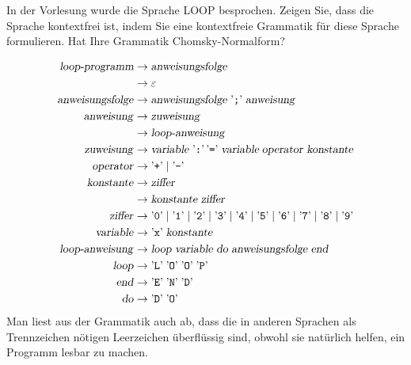 In der Vorlesung wurde die Sprache LOOP besprochen. Zeigen Sie, dass
die Sprache kontextfrei ist, indem Sie eine
kontextfreie Grammatik für diese Sprache formulieren.
Hat Ihre Grammatik Chomsky-Normalform?

\begin{loesung}
\begin{align*}
\text{\textsl{loop-programm}}&\to\text{\textsl{anweisungsfolge}}\\
&\to\varepsilon\\
\text{\textsl{anweisungsfolge}}
&\to\text{\textsl{anweisungsfolge}}\;\text{'{\tt ;}'}\;
\text{\textsl{anweisung}}
\\
\text{\textsl{anweisung}}
&\to\text{\textsl{zuweisung}}
\\
&\to\text{\textsl{loop-anweisung}}
\\
\text{\textsl{zuweisung}}
&\to
\text{\textsl{variable}}\; \text{'{\tt :}'}\, \text{'{\tt =}'}\;
\textsl{variable}\;\text{\textsl{operator}}\;\text{\textsl{konstante}}
\\
\text{\textsl{operator}}
&\to\text{'{\tt +}'}\;|\;\text{'{\tt -}'}
\\
\text{\textsl{konstante}}&\to\text{\textsl{ziffer}}\\
&\to\text{\textsl{konstante}}\;\text{\textsl{ziffer}}
\\
\text{\textsl{ziffer}}&\to 
\text{'{\tt 0}'}\;|\;
\text{'{\tt 1}'}\;|\;
\text{'{\tt 2}'}\;|\;
\text{'{\tt 3}'}\;|\;
\text{'{\tt 4}'}\;|\;
\text{'{\tt 5}'}\;|\;
\text{'{\tt 6}'}\;|\;
\text{'{\tt 7}'}\;|\;
\text{'{\tt 8}'}\;|\;
\text{'{\tt 9}'}\\
\text{\textsl{variable}}&\to \text{'{\tt x}'}\;\text{\textsl{konstante}}\\
\text{\textsl{loop-anweisung}}&\to
\text{\textsl{loop}}\;
\text{\textsl{variable}}\;
\text{\textsl{do}}\;
\text{\textsl{anweisungsfolge}}\;
\text{\textsl{end}}\\
\text{\textsl{loop}}&\to \text{'{\tt L}'}\; \text{'{\tt O}'}\; \text{'{\tt O}'}\; \text{'{\tt P}'}\\
\text{\textsl{end}}&\to \text{'{\tt E}'}\; \text{'{\tt N}'}\; \text{'{\tt D}'}\\
\text{\textsl{do}}&\to \text{'{\tt D}'}\; \text{'{\tt O}'} \\
\end{align*}
Man liest aus der Grammatik auch ab, dass die in anderen Sprachen als
Trennzeichen nötigen Leerzeichen überflüssig sind, obwohl sie natürlich
helfen, ein Programm lesbar zu machen.


\end{loesung}
